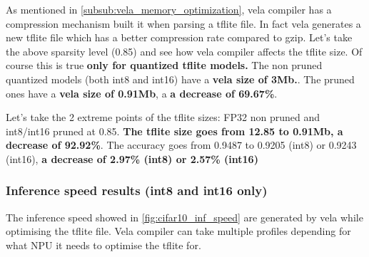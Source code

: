 As mentioned in \autoref{subsub:vela_memory_optimization}, vela compiler has a
compression mechanism built it when parsing a tflite file. In fact vela
generates a new tflite file which has a better compression rate compared to
gzip. Let's take the above sparsity level (0.85) and see how vela compiler
affects the tflite size. Of course this is true \textbf{only for quantized
tflite models.}
The non pruned quantized models (both int8 and int16) have a \textbf{vela size
of 3Mb.}. The pruned ones have a \textbf{vela size of 0.91Mb}, a \textbf{a
decrease of 69.67\%}.

Let's take the 2 extreme points of the tflite sizes: FP32 non pruned and
int8/int16 pruned at 0.85. \textbf{The tflite size goes from 12.85 to 0.91Mb,
a decrease of 92.92\%}. The accuracy goes from 0.9487 to 0.9205
(int8) or 0.9243 (int16), \textbf{a decrease of 2.97\% (int8) or 2.57\% (int16)}

\subsubsection{Inference speed results (int8 and int16 only)}
The inference speed showed in \autoref{fig:cifar10_inf_speed} are generated by
vela while optimising the tflite file. Vela compiler can take multiple profiles
depending for what NPU it needs to optimise the tflite for.

